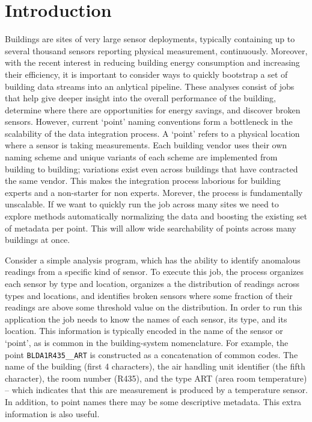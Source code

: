 \section{Introduction}

Buildings are sites of very large sensor deployments, typically containing
up to several thousand sensors reporting physical measurement, continuously.
Moreover, with the recent interest in reducing building energy consumption and
increasing their efficiency, it
is important to consider ways to quickly bootstrap a set of building data streams
into an anlytical pipeline.  These analyses consist of jobs that help give deeper
insight into the overall performance of the building, 
determine where there are opportunities for energy savings, and 
discover broken sensors.
However, current `point' naming conventions form a bottleneck in the scalability of
the data integration process.  A `point' refers to a physical location where
a sensor is taking measurements. Each building vendor uses their own naming scheme and
unique variants of each scheme are implemented from building to building; variations exist
even across buildings that have contracted the same vendor.
This makes the integration process laborious for building experts and a non-starter for 
non experts.  Morever, the process is fundamentally unscalable. 
If we want to quickly run the job across many sites we need
to explore methods automatically normalizing the data and boosting the
existing set of metadata per point.  This will allow wide searchability of points across
many buildings at once.

Consider a simple analysis program, which has the ability
to identify anomalous readings from a specific kind of sensor. To execute this job, 
the process organizes each sensor by type and location, organizes a the distribution of
readings across types and locations, and identifies broken sensors where some fraction of
their readings are above some threshold value on the distribution.
In order to run this application
the job needs to know the names of each sensor, its type, and its location.  
This information is typically encoded in the name of the sensor or `point', as is
common in the building-system nomenclature.  For example, the point
\texttt{BLDA1R435\_\_ART} is constructed as a concatenation of common codes.
The name of the building (first 4 characters), the air handling unit identifier (the 
fifth character), the room number (R435), and the type ART (area room temperature) -- which 
indicates that this are measurement is produced by a temperature sensor. In addition,
to point names there may be some descriptive metadata.  This extra information is 
also useful.

